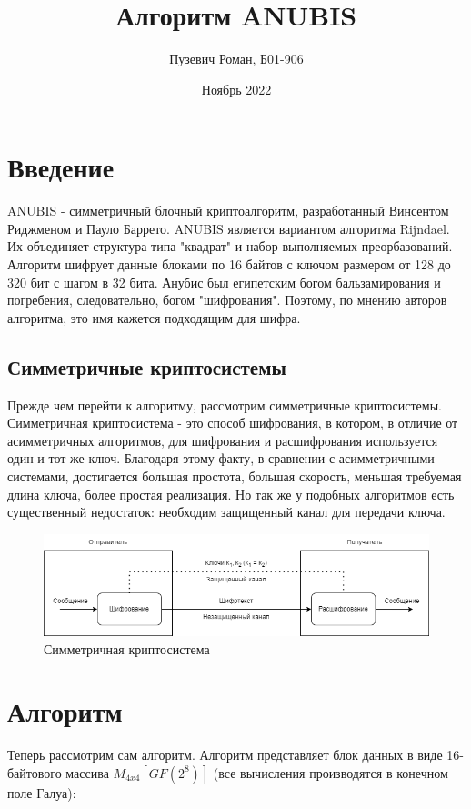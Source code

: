 \documentclass[12pt]{article}
\title{Алгоритм ANUBIS}
\date{Ноябрь 2022}
\author{Пузевич Роман, Б01-906}
\begin{document}
\maketitle

\section{Введение}
ANUBIS - симметричный блочный криптоалгоритм, разработанный Винсентом Риджменом и Пауло Баррето. ANUBIS является вариантом алгоритма Rijndael. Их объединяет структура типа "квадрат" и набор выполняемых преорбазований. Алгоритм шифрует данные блоками по 16 байтов с ключом размером от 128 до 320 бит с шагом в 32 бита. Анубис был египетским богом бальзамирования и погребения, следовательно, богом "шифрования". Поэтому, по мнению авторов алгоритма, это имя кажется подходящим для шифра.

\subsection{Симметричные криптосистемы}
Прежде чем перейти к алгоритму, рассмотрим симметричные криптосистемы. Симметричная криптосистема - это способ шифрования, в котором, в отличие от асимметричных алгоритмов, для шифрования и расшифрования используется один и тот же ключ. Благодаря этому факту, в сравнении с асимметричными системами, достигается большая простота, большая скорость, меньшая требуемая длина ключа, более простая реализация. Но так же у подобных алгоритмов есть существенный недостаток: необходим защищенный канал для передачи ключа.

\begin{figure}[h]
    \centering
    \includegraphics[width=0.8\linewidth]{scheme.png}
    \caption{Симметричная криптосистема}
    \label{fig:scheme}
\end{figure}

\section{Алгоритм}
Теперь рассмотрим сам алгоритм. Алгоритм представляет блок данных в виде 16-байтового массива $M_{4x4}[GF(2^{8})]$ (все вычисления производятся в конечном поле Галуа):
\end{document}
